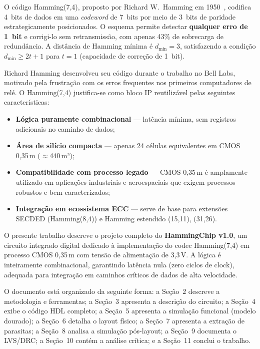 \documentclass[12pt,a4paper]{article}
\begin{document}
O código Hamming(7,4), proposto por Richard W.\ Hamming em 1950~\cite{hamming1950}, codifica 4~bits de dados em uma \textit{codeword} de 7~bits por meio de 3~bits de paridade estrategicamente posicionados. O esquema permite detectar \textbf{qualquer erro de 1~bit} e corrigi-lo sem retransmissão, com apenas 43\% de sobrecarga de redundância. A distância de Hamming mínima é $d_{\min}=3$, satisfazendo a condição $d_{\min} \geq 2t+1$ para $t=1$ (capacidade de correção de 1~bit).

\begin{unidadebox}
Richard Hamming desenvolveu seu código durante o trabalho no Bell Labs, motivado pela frustração com os erros frequentes nos primeiros computadores de relé. O Hamming(7,4) justifica-se como bloco IP reutilizável pelas seguintes características:
\begin{itemize}[leftmargin=1.5em]
  \item \textbf{Lógica puramente combinacional} --- latência mínima, sem registros adicionais no caminho de dados;
  \item \textbf{Área de silício compacta} --- apenas 24 células equivalentes em CMOS 0,35\,\textmu m ($\approx$440\,\textmu m²);
  \item \textbf{Compatibilidade com processo legado} --- CMOS 0,35\,\textmu m é amplamente utilizado em aplicações industriais e aeroespaciais que exigem processos robustos e bem caracterizados;
  \item \textbf{Integração em ecossistema ECC} --- serve de base para extensões SECDED (Hamming(8,4)) e Hamming estendido (15,11), (31,26).
\end{itemize}
\end{unidadebox}

O presente trabalho descreve o projeto completo do \textbf{HammingChip v1.0}, um circuito integrado digital dedicado à implementação do codec Hamming(7,4) em processo CMOS 0,35\,\textmu m com tensão de alimentação de 3,3\,V. A lógica é inteiramente combinacional, garantindo latência nula (zero ciclos de clock), adequada para integração em caminhos críticos de dados de alta velocidade.

O documento está organizado da seguinte forma: a Seção~2 descreve a metodologia e ferramentas; a Seção~3 apresenta a descrição do circuito; a Seção~4 exibe o código HDL completo; a Seção~5 apresenta a simulação funcional (modelo dourado); a Seção~6 detalha o layout físico; a Seção~7 apresenta a extração de parasitas; a Seção~8 analisa a simulação pós-layout; a Seção~9 documenta o LVS/DRC; a Seção~10 contém a análise crítica; e a Seção~11 conclui o trabalho.
\end{document}
